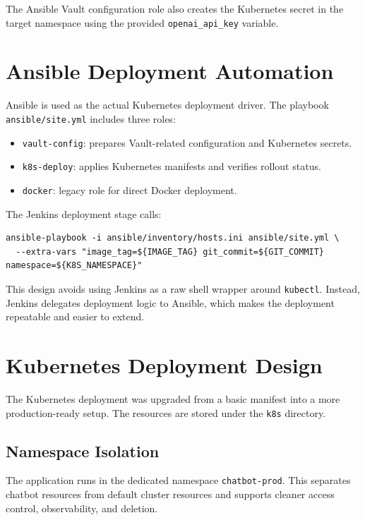 \documentclass[12pt,a4paper]{article}
\begin{document}
The Ansible Vault configuration role also creates the Kubernetes secret in the
target namespace using the provided \texttt{openai\_api\_key} variable.

\section{Ansible Deployment Automation}

Ansible is used as the actual Kubernetes deployment driver. The playbook
\texttt{ansible/site.yml} includes three roles:

\begin{itemize}[leftmargin=*]
    \item \texttt{vault-config}: prepares Vault-related configuration and Kubernetes secrets.
    \item \texttt{k8s-deploy}: applies Kubernetes manifests and verifies rollout status.
    \item \texttt{docker}: legacy role for direct Docker deployment.
\end{itemize}

The Jenkins deployment stage calls:

\begin{lstlisting}[style=projectcode]
ansible-playbook -i ansible/inventory/hosts.ini ansible/site.yml \
  --extra-vars "image_tag=${IMAGE_TAG} git_commit=${GIT_COMMIT} namespace=${K8S_NAMESPACE}"
\end{lstlisting}

This design avoids using Jenkins as a raw shell wrapper around \texttt{kubectl}.
Instead, Jenkins delegates deployment logic to Ansible, which makes the
deployment repeatable and easier to extend.

\section{Kubernetes Deployment Design}

The Kubernetes deployment was upgraded from a basic manifest into a more
production-ready setup. The resources are stored under the \texttt{k8s}
directory.

\subsection{Namespace Isolation}

The application runs in the dedicated namespace \texttt{chatbot-prod}. This
separates chatbot resources from default cluster resources and supports cleaner
access control, observability, and deletion.
\end{document}
